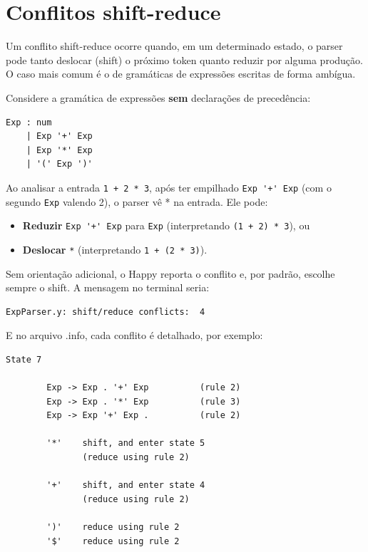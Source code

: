 \section{Conflitos shift-reduce}

Um conflito shift-reduce ocorre quando, em um determinado estado, o
parser pode tanto deslocar (shift) o próximo token quanto reduzir por
alguma produção. O caso mais comum é o de gramáticas de expressões
escritas de forma ambígua.

Considere a gramática de expressões \textbf{sem} declarações de precedência:

\begin{verbatim}
Exp : num
    | Exp '+' Exp
    | Exp '*' Exp
    | '(' Exp ')'
\end{verbatim}

Ao analisar a entrada \verb|1 + 2 * 3|, após ter
empilhado \verb|Exp '+' Exp| (com o segundo
\verb|Exp| valendo 2), o
parser vê * na entrada. Ele pode:

\begin{itemize}
  \item
    \textbf{Reduzir} \verb|Exp '+' Exp| para
    \verb|Exp| (interpretando
    \verb|(1 + 2) * 3|), ou
  \item
    \textbf{Deslocar} \verb|*| (interpretando
    \verb|1 + (2 * 3)|).
\end{itemize}

Sem orientação adicional, o Happy reporta o conflito e, por padrão,
escolhe sempre o shift. A mensagem no terminal seria:

\begin{verbatim}
ExpParser.y: shift/reduce conflicts:  4
\end{verbatim}

E no arquivo .info, cada conflito é
detalhado, por exemplo:

\begin{verbatim}
State 7

        Exp -> Exp . '+' Exp          (rule 2)
        Exp -> Exp . '*' Exp          (rule 3)
        Exp -> Exp '+' Exp .          (rule 2)

        '*'    shift, and enter state 5
               (reduce using rule 2)

        '+'    shift, and enter state 4
               (reduce using rule 2)

        ')'    reduce using rule 2
        '$'    reduce using rule 2
\end{verbatim}

